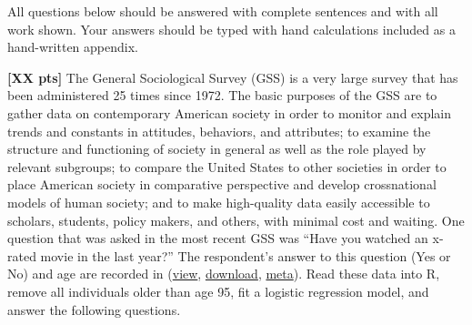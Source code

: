 \documentclass[10pt,openany]{book}\usepackage[]{graphicx}\usepackage[]{color}
\begin{document}
\newpage
\begin{hwsection}{All questions below should be answered with complete sentences and with all work shown.  Your answers should be typed with hand calculations included as a hand-written appendix.}

  \item \label{hwprob:LMlogisticGSS} \textbf{[XX pts]}  The General Sociological Survey (GSS) is a very large survey that has been administered 25 times since 1972.  The basic purposes of the GSS are to gather data on contemporary American society in order to monitor and explain trends and constants in attitudes, behaviors, and attributes; to examine the structure and functioning of society in general as well as the role played by relevant subgroups; to compare the United States to other societies in order to place American society in comparative perspective and develop crossnational models of human society; and to make high-quality data easily accessible to scholars, students, policy makers, and others, with minimal cost and waiting.  One question that was asked in the most recent GSS was ``Have you watched an x-rated movie in the last year?''  The respondent's answer to this question (Yes or No) and age are recorded in  (\href{https://github.com/droglenc/NCData/blob/master/XMovieAge.csv}{view}, \href{https://raw.githubusercontent.com/droglenc/NCData/master/XMovieAge.csv}{download}, \href{https://github.com/droglenc/NCData/blob/master/XMovieAge_meta.txt}{meta}).  Read these data into R, remove all individuals older than age 95, fit a logistic regression model, and answer the following questions.


\end{hwsection}
\end{document}
